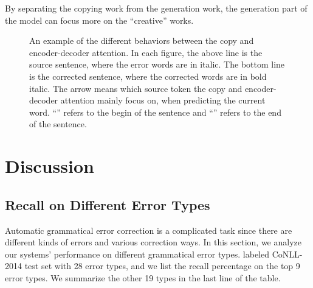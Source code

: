 \documentclass[11pt,a4paper]{article}
\begin{document}
By separating the copying work from the generation work, the generation part of the model can focus more on the ``creative'' works.


\begin{figure*}
\begin{center}


\caption{An example of the different behaviors between the copy and encoder-decoder attention. In each figure, the above line is the source sentence, where the error words are in italic. The bottom line is the corrected sentence, where the corrected words are in bold italic. The arrow means which source token the copy and encoder-decoder attention mainly focus on, when predicting the current word. ``'' refers to the begin of the sentence and ``'' refers to the end of the sentence.}
\label{fig:align}
\end{center}
\end{figure*}


\section{Discussion}

\subsection{Recall on Different Error Types}
Automatic grammatical error correction is a complicated task since there are different kinds of errors and various correction ways. In this section, we analyze our systems' performance on different grammatical error types. \cite{ng2014conll} labeled CoNLL-2014 test set with 28 error types, and we list the recall percentage on the top 9 error types. We summarize the other 19 types in the last line of the table.
\end{document}
